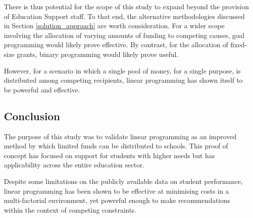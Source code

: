 \documentclass[11pt, a4paper]{article}
\begin{document}
    There is thus potential for the scope of this study to expand beyond the provision of Education Support staff. To that end, the alternative methodologies discussed in Section \ref{solution_approach} are worth consideration. For a wider scope involving the allocation of varying amounts of funding to competing causes, goal programming would likely prove effective. By contrast, for the allocation of fixed-size grants, binary programming would likely prove useful.

    However, for a scenario in which a single pool of money, for a single purpose, is distributed among competing recipients, linear programming has shown itself to be powerful and effective.

    \subsection{Conclusion}

    The purpose of this study was to validate linear programming as an improved method by which limited funds can be distributed to schools. This proof of concept has focused on support for students with higher needs but has applicability across the entire education sector. 

    Despite some limitations on the publicly available data on student performance, linear programming has been shown to be effective at minimising costs in a multi-factorial environment, yet powerful enough to make recommendations within the context of competing constraints. 

    \newpage

    \printbibliography 
\end{document}
